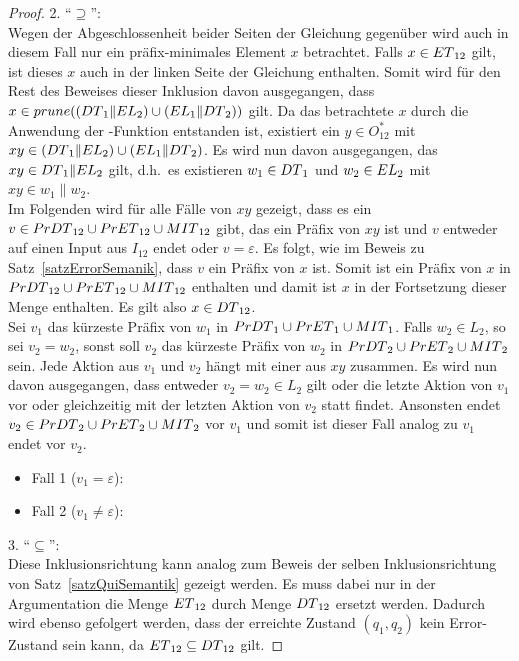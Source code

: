 \begin{proof}
  2. ``$\supseteq$'':\\
  Wegen der Abgeschlossenheit beider Seiten der Gleichung gegenüber \cont{}
  wird auch in diesem Fall nur ein präfix-minimales Element $x$ betrachtet.
  Falls $x\in ET{}_{12}$ gilt, ist dieses $x$ auch in der linken Seite der
  Gleichung enthalten. Somit wird für den Rest des Beweises dieser Inklusion
  davon ausgegangen, dass $x\in prune{}((DT{}_1\|EL{}_2)\cup
  (EL{}_1\|DT{}_2))$ gilt. Da das betrachtete $x$ durch die Anwendung der
  \prune{}-Funktion entstanden ist, existiert ein $y\in O_{12}^*$ mit $xy\in
  (DT{}_1\|EL{}_2)\cup (EL{}_1\|DT{}_2)$. Es wird nun davon ausgegangen,
  das \oBdA{} $xy\in DT{}_1\|EL{}_2$ gilt, d.h.\ es existieren
  $w_1\in DT{}_1$ und $w_2\in EL{}_2$ mit $xy\in w_1\|w_2$.\\
  Im Folgenden wird für alle Fälle von $xy$ gezeigt, dass es ein
  $v\in PrDT{}_{12}\cup PrET{}_{12}\cup MIT{}_{12}$ gibt, das ein Präfix von
  $xy$ ist und $v$ entweder auf einen Input aus $I_{12}$ endet oder
  $v=\varepsilon$. Es folgt, wie im Beweis zu Satz~\ref{satzErrorSemanik}, dass
  $v$ ein Präfix von $x$ ist. Somit ist ein Präfix von $x$ in $PrDT{}_{12}\cup
  PrET{}_{12}\cup MIT{}_{12}$ enthalten und damit ist $x$ in der Fortsetzung
  dieser Menge enthalten. Es gilt also $x\in DT{}_{12}$.\\
  Sei $v_1$ das kürzeste Präfix von $w_1$ in $PrDT{}_1\cup PrET{}_1\cup
  MIT{}_1$. Falls $w_2\in L_2$, so sei $v_2=w_2$, sonst soll $v_2$ das
  kürzeste Präfix von $w_2$ in $PrDT{}_2\cup PrET{}_2\cup MIT{}_2$ sein.
  Jede Aktion aus $v_1$ und $v_2$ hängt mit einer aus $xy$ zusammen. Es wird
  nun davon ausgegangen, dass entweder $v_2=w_2\in L_2$ gilt oder die letzte
  Aktion von $v_1$ vor oder gleichzeitig mit der letzten Aktion von $v_2$ statt
  findet. Ansonsten endet $v_2\in PrDT{}_2\cup PrET{}_2\cup MIT{}_2$ vor
  $v_1$ und somit ist dieser Fall analog zu $v_1$ endet vor $v_2$.
  \begin{itemize}
    \item Fall 1 ($v_1=\varepsilon$):
    \item Fall 2 ($v_1\neq\varepsilon$):
  \end{itemize}

  3. ``$\subseteq$'':\\
  Diese Inklusionsrichtung kann analog zum Beweis der selben Inklusionsrichtung
  von Satz~\ref{satzQuiSemantik} gezeigt werden. Es muss dabei nur in der
  Argumentation die Menge $ET{}_{12}$ durch Menge $DT{}_{12}$ ersetzt werden.
  Dadurch wird ebenso gefolgert werden, dass der erreichte Zustand $(q_1,q_2)$
  kein Error-Zustand sein kann, da $ET{}_{12}\subseteq DT{}_{12}$ gilt.


\end{proof}
